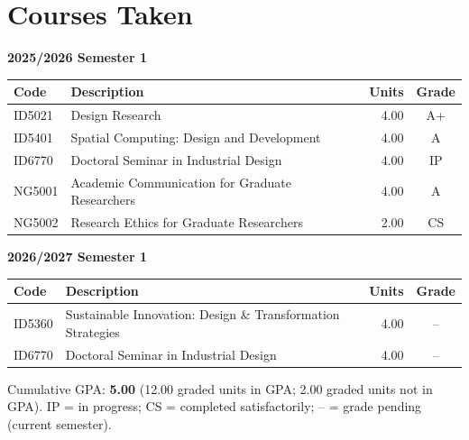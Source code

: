 \documentclass[12pt]{article}
\begin{document}
\section{Courses Taken}

\begin{footnotesize}
\setlength{\tabcolsep}{4pt}
\noindent
\begin{minipage}[t]{0.485\textwidth}
  \textbf{2025/2026 Semester 1}\\[0.4em]
  \begin{tabular}{@{}p{1.25cm}>{\raggedright\arraybackslash}p{3.75cm}rc@{}}
  \toprule
  \textbf{Code} & \textbf{Description} & \textbf{Units} & \textbf{Grade} \\
  \midrule
  ID5021  & Design Research                                   & 4.00 & A+ \\
  ID5401  & Spatial Computing: Design and Development         & 4.00 & A \\
  ID6770  & Doctoral Seminar in Industrial Design             & 4.00 & IP \\
  NG5001  & Academic Communication for Graduate Researchers   & 4.00 & A \\
  NG5002  & Research Ethics for Graduate Researchers          & 2.00 & CS \\
  \bottomrule
  \end{tabular}
\end{minipage}
\hfill
\begin{minipage}[t]{0.485\textwidth}
  \textbf{2026/2027 Semester 1}\\[0.4em]
  \begin{tabular}{@{}p{1.25cm}>{\raggedright\arraybackslash}p{3.75cm}rc@{}}
  \toprule
  \textbf{Code} & \textbf{Description} & \textbf{Units} & \textbf{Grade} \\
  \midrule
  ID5360  & Sustainable Innovation: Design \& Transformation Strategies & 4.00 & -- \\
  ID6770  & Doctoral Seminar in Industrial Design             & 4.00 & -- \\
  \bottomrule
  \end{tabular}
\end{minipage}
\end{footnotesize}

\vspace{0.4em}
{\footnotesize Cumulative GPA: \textbf{5.00} (12.00 graded units in GPA; 2.00 graded units not in GPA). IP = in progress; CS = completed satisfactorily; -- = grade pending (current semester).}
\end{document}
